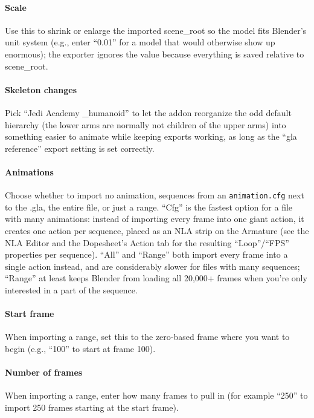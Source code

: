 \documentclass[a4paper,10pt]{article}
\begin{document}
\paragraph*{Scale}
Use this to shrink or enlarge the imported scene\_root so the model fits Blender's unit system (e.g., enter
``0.01'' for a model that would otherwise show up enormous); the exporter ignores the value because everything
is saved relative to scene\_root.

\paragraph*{Skeleton changes}
Pick ``Jedi Academy \_humanoid'' to let the addon reorganize the odd default hierarchy (the lower arms are
normally not children of the upper arms) into something easier to animate while keeping exports working, as long
as the ``gla reference'' export setting is set correctly.

\paragraph*{Animations}
Choose whether to import no animation, sequences from an \texttt{animation.cfg} next to the .gla, the entire
file, or just a range. ``Cfg'' is the fastest option for a file with many animations: instead of importing
every frame into one giant action, it creates one action per sequence, placed as an NLA strip on the
Armature (see the NLA Editor and the Dopesheet's Action tab for the resulting ``Loop''/``FPS'' properties per
sequence). ``All'' and ``Range'' both import every frame into a single action instead, and are considerably
slower for files with many sequences; ``Range'' at least keeps Blender from loading all 20,000+ frames when
you're only interested in a part of the sequence.

\paragraph*{Start frame}
When importing a range, set this to the zero-based frame where you want to begin (e.g., ``100'' to start at frame 100).

\paragraph*{Number of frames}
When importing a range, enter how many frames to pull in (for example ``250'' to import 250 frames starting at the
start frame).
 
\end{document}
